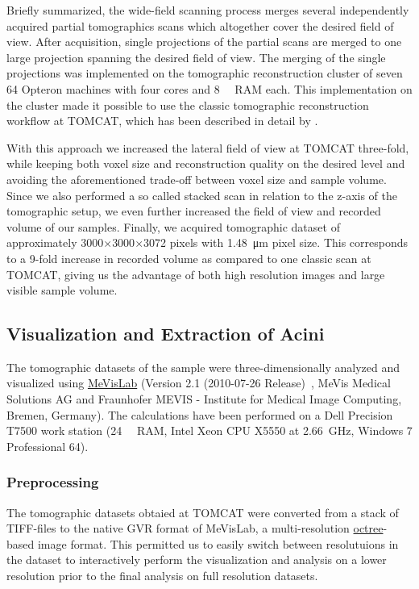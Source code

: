 \documentclass[%
	draft=true,
	paper=a4,%
	twoside=true,%
	abstract=true]{scrartcl}
\begin{document}
Briefly summarized, the wide-field scanning process merges several independently acquired partial tomographics scans which altogether cover the desired field of view. After acquisition, single projections of the partial scans are merged to one large projection spanning the desired field of view. The merging of the single projections was implemented on the tomographic reconstruction cluster of seven \SI{64}{\bit} Opteron machines with four cores and \SI{8}{\giga\byte} RAM each. This implementation on the cluster made it possible to use the classic tomographic reconstruction workflow at TOMCAT, which has been described in detail by \citet{Hintermueller2010}.

With this approach we increased the lateral field of view at TOMCAT three-fold, while keeping both voxel size and reconstruction quality on the desired level and avoiding the aforementioned trade-off between voxel size and sample volume. Since we also performed a so called stacked scan in relation to the z-axis of the tomographic setup, we even further increased the field of view and recorded volume of our samples. Finally, we acquired tomographic dataset of approximately 3000\(\times\)3000\(\times\)3072 pixels with \SI{1.48}{\micro\meter} pixel size. This corresponds to a 9-fold increase in recorded volume as compared to one classic scan at TOMCAT, giving us the advantage of both high resolution images and large visible sample volume.

\subsection{Visualization and Extraction of Acini}
The tomographic datasets of the sample were three-dimensionally analyzed and visualized using \href{http://mevislab.de}{MeVisLab} (Version 2.1 (2010-07-26 Release)~\cite{Bitter2007}, MeVis Medical Solutions AG and Fraunhofer MEVIS - Institute for Medical Image Computing, Bremen, Germany). The calculations have been performed on a Dell Precision T7500 work station (\SI{24}{\giga\byte} RAM, Intel Xeon CPU X5550 at \SI{2.66}{\giga\hertz}, Windows 7 Professional \SI{64}{\bit}).

\subsubsection{Preprocessing}
The tomographic datasets obtaied at TOMCAT were converted from a stack of TIFF-files to the native GVR format of MeVisLab, a multi-resolution \href{https://secure.wikimedia.org/wikipedia/en/w/index.php?title=Octree&oldid=409131920}{octree}-based image format. This permitted us to easily switch between resolutuions in the dataset to interactively perform the visualization and analysis on a lower resolution prior to the final analysis on full resolution datasets.
\end{document}
